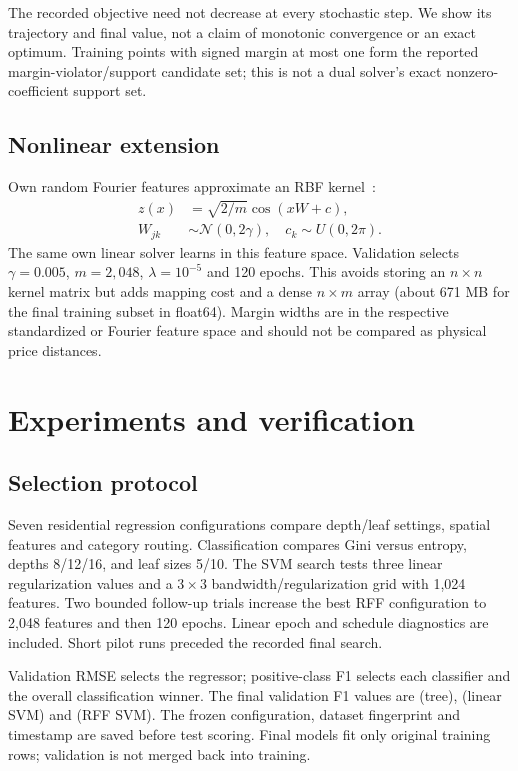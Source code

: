 \documentclass[10pt,twocolumn,a4paper]{article}
\begin{document}
The recorded objective need not decrease at every stochastic step. We show its trajectory and final value, not a claim of monotonic convergence or an exact optimum. Training points with signed margin at most one form the reported margin-violator/support candidate set; this is not a dual solver's exact nonzero-coefficient support set.

\subsection{Nonlinear extension}
Own random Fourier features approximate an RBF kernel~\cite{rff}:
\begin{equation}
\begin{aligned}
z(x)&=\sqrt{2/m}\cos(xW+c),\\
W_{jk}&\sim\mathcal N(0,2\gamma),\quad c_k\sim U(0,2\pi).
\end{aligned}
\end{equation}
The same own linear solver learns in this feature space. Validation selects $\gamma=0.005$, $m=2,048$, $\lambda=10^{-5}$ and 120 epochs. This avoids storing an $n\times n$ kernel matrix but adds mapping cost and a dense $n\times m$ array (about 671 MB for the final training subset in float64). Margin widths are in the respective standardized or Fourier feature space and should not be compared as physical price distances.

\section{Experiments and verification}
\subsection{Selection protocol}
Seven residential regression configurations compare depth/leaf settings, spatial features and category routing. Classification compares Gini versus entropy, depths 8/12/16, and leaf sizes 5/10. The SVM search tests three linear regularization values and a $3\times3$ bandwidth/regularization grid with 1,024 features. Two bounded follow-up trials increase the best RFF configuration to 2,048 features and then 120 epochs. Linear epoch and schedule diagnostics are included. Short pilot runs preceded the recorded final search.

Validation RMSE selects the regressor; positive-class F1 selects each classifier and the overall classification winner. The final validation F1 values are \treeValFone{} (tree), \linearValFone{} (linear SVM) and \rffValFone{} (RFF SVM). The frozen configuration, dataset fingerprint and timestamp are saved before test scoring. Final models fit only original training rows; validation is not merged back into training.
\end{document}
